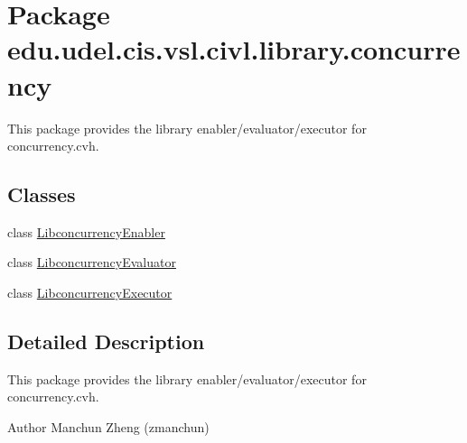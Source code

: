 \hypertarget{namespaceedu_1_1udel_1_1cis_1_1vsl_1_1civl_1_1library_1_1concurrency}{}\section{Package edu.\+udel.\+cis.\+vsl.\+civl.\+library.\+concurrency}
\label{namespaceedu_1_1udel_1_1cis_1_1vsl_1_1civl_1_1library_1_1concurrency}


This package provides the library enabler/evaluator/executor for concurrency.\+cvh.  


\subsection*{Classes}
\begin{DoxyCompactItemize}
\item 
class \hyperlink{classedu_1_1udel_1_1cis_1_1vsl_1_1civl_1_1library_1_1concurrency_1_1LibconcurrencyEnabler}{Libconcurrency\+Enabler}
\item 
class \hyperlink{classedu_1_1udel_1_1cis_1_1vsl_1_1civl_1_1library_1_1concurrency_1_1LibconcurrencyEvaluator}{Libconcurrency\+Evaluator}
\item 
class \hyperlink{classedu_1_1udel_1_1cis_1_1vsl_1_1civl_1_1library_1_1concurrency_1_1LibconcurrencyExecutor}{Libconcurrency\+Executor}
\end{DoxyCompactItemize}


\subsection{Detailed Description}
This package provides the library enabler/evaluator/executor for concurrency.\+cvh. 

\begin{DoxyAuthor}{Author}
Manchun Zheng (zmanchun) 
\end{DoxyAuthor}
